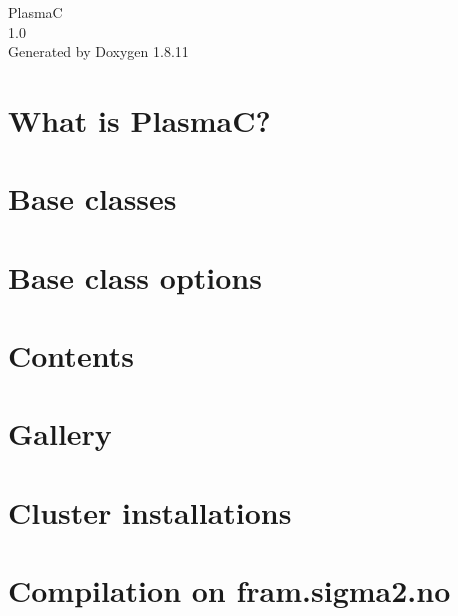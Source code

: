 \documentclass[twoside]{book}
\newcommand{\+}{\discretionary{\mbox{\scriptsize$\hookleftarrow$}}{}{}}
\newcommand{\clearemptydoublepage}{%
  \newpage{\pagestyle{empty}\cleardoublepage}%
}
\begin{document}
\hypersetup{pageanchor=false,
             bookmarksnumbered=true,
             pdfencoding=unicode
            }
\begin{titlepage}
\vspace*{7cm}
\begin{center}%
{\Large PlasmaC \\[1ex]\large 1.\+0 }\\
\vspace*{1cm}
{\large Generated by Doxygen 1.8.11}\\
\end{center}
\end{titlepage}
\clearemptydoublepage
\tableofcontents
\clearemptydoublepage
{}
\hypersetup{pageanchor=true}

\chapter{What is PlasmaC?}
\label{index}\hypertarget{index}{}
\chapter{Base classes}
\label{base-classes}
\hypertarget{base-classes}{}

\chapter{Base class options}
\label{class-options}
\hypertarget{class-options}{}

\chapter{Contents}
\label{doxy-contents}
\hypertarget{doxy-contents}{}

\chapter{Gallery}
\label{gallery}
\hypertarget{gallery}{}

\chapter{Cluster installations}
\label{cluster-installations}
\hypertarget{cluster-installations}{}

\chapter{Compilation on fram.\+sigma2.\+no}
\label{installation-fram}
\hypertarget{installation-fram}{}

\end{document}
